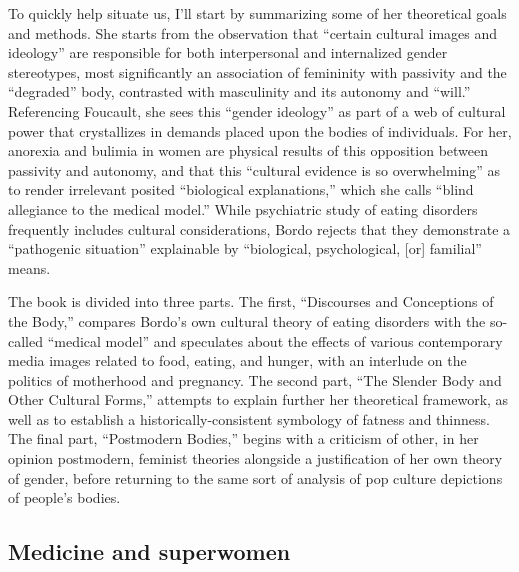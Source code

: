 \documentclass[11pt]{article}
\begin{document}
    To quickly help situate us, I'll start by summarizing some of her theoretical goals and methods. She starts from the observation that ``certain cultural images and ideology'' are responsible for both interpersonal and internalized gender stereotypes, most significantly an association of femininity with passivity and the ``degraded'' body, contrasted with masculinity and its autonomy and ``will.''~\autocite[16.3]{Bordo03} Referencing Foucault, she sees this ``gender ideology'' as part of a web of cultural power that crystallizes in demands placed upon the bodies of individuals. For her, anorexia and bulimia in women are physical results of this opposition between passivity and autonomy, and that this ``cultural evidence is so overwhelming'' as to render irrelevant posited ``biological explanations,'' which she calls ``blind allegiance to the medical model.'' While psychiatric study of eating disorders frequently includes cultural considerations, Bordo rejects that they demonstrate a ``pathogenic situation'' explainable by ``biological, psychological, [or] familial'' means.~\autocite[35, 49]{Bordo03} 

    The book is divided into three parts. The first, ``Discourses and Conceptions of the Body,'' compares Bordo's own cultural theory of eating disorders with the so-called ``medical model'' and speculates about the effects of various contemporary media images related to food, eating, and hunger, with an interlude on the politics of motherhood and pregnancy. The second part, ``The Slender Body and Other Cultural Forms,'' attempts to explain further her theoretical framework, as well as to establish a historically-consistent symbology of fatness and thinness. The final part, ``Postmodern Bodies,'' begins with a criticism of other, in her opinion postmodern, feminist theories alongside a justification of her own theory of gender, before returning to the same sort of analysis of pop culture depictions of people's bodies. 
    
    \subsection*{Medicine and superwomen}
\end{document}
